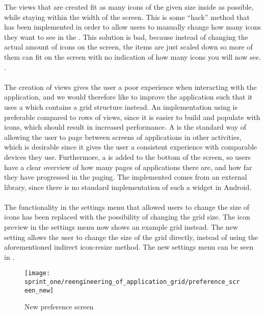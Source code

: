 The  views that are created fit as many icons of the given size inside as possible, while staying within the width of the screen. This is some ``hack'' method that has been implemented in order to allow users to manually change how many icons they want to see in the \launcher. This solution is bad, because instead of changing the actual amount of icons on the screen, the items are just scaled down so more of them can fit on the screen with no indication of how many icons you will now see. .
\\\\
The creation of  views gives the user a poor experience when interacting with the application, and we would therefore like to improve the \launcher application such that it uses a  which contains a grid structure instead. An implementation using  is preferable compared to rows of  views, since it is easier to build and populate with icons, which should result in increased performance. A  is the standard way of allowing the user to page between screens of applications in other \launcher activities, which is desirable since it gives the user a consistent experience with comparable devices they use. Furthermore, a  is added to the bottom of the screen, so users have a clear overview of how many pages of applications there are, and how far they have progressed in the paging. The implemented  comes from an external library\parencite{view_pager_indicator_avianey}, since there is no standard implementation of such a widget in Android. 
\\\\
The functionality in the settings menu that allowed users to change the size of icons has been replaced with the possibility of changing the \launcher grid size. The icon preview in the settings menu now shows an example grid instead. The new setting allows the user to change the size of the grid directly, instead of using the aforementioned indirect icon-resize method. The new settings menu can be seen in .


\begin{figure}[!htbp]
    \centering
    \texttt{[image: sprint\_one/reengineering\_of\_application\_grid/preference\_screen\_new]}
    \caption{New preference screen}
    \label{fig:preference_screen_new}
\end{figure}
